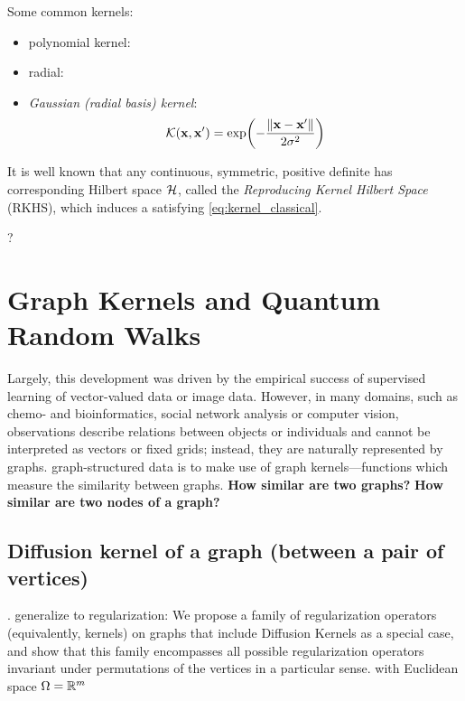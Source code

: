 Some common kernels: 
\begin{itemize}
	\item polynomial kernel:
	\item radial:
	\item \emph{Gaussian (radial basis) kernel}:
	\begin{equation}
		\mathcal{K}(\vb{x},\vb{x}') = 
		\exp(-\frac{\norm{\vb{x}-\vb{x}'}}{2\sigma^2})
	\end{equation}
\end{itemize}

\begin{definition}
	It is well known that any continuous, symmetric, positive definite  has corresponding Hilbert space $\mathcal{H}$, called the \emph{Reproducing Kernel Hilbert Space} (RKHS),
	which induces a 
	satisfying \cref{eq:kernel_classical}.
\end{definition}
\begin{theorem}
	?
\end{theorem}

\section{Graph Kernels and Quantum Random Walks}
Largely, this development was driven by the empirical success of supervised learning of vector-valued data or image data. However, in many domains, such as chemo- and bioinformatics, social network analysis or computer vision, observations describe relations between objects or individuals and cannot be interpreted as vectors or fixed grids; instead, they are naturally represented by graphs.
\cite{kriegeSurveyGraphKernels2020}
graph-structured data is to make use of graph kernels—functions which measure the similarity between graphs.
\textbf{How similar are two graphs?}
\textbf{How similar are two nodes of a graph?}

\subsection{Diffusion kernel of a graph (between a pair of vertices)}
\cite{kondorDiffusionKernelsGraphs2002}.
generalize to regularization: 
We propose a family of regularization operators (equivalently, kernels) on graphs that include Diffusion Kernels as a special case, and show that this family encompasses all possible regularization operators invariant under permutations of the vertices in a particular sense.
\cite{smolaKernelsRegularizationGraphs2003}
with Euclidean space $\Omega = \mathbb{R}^m$

